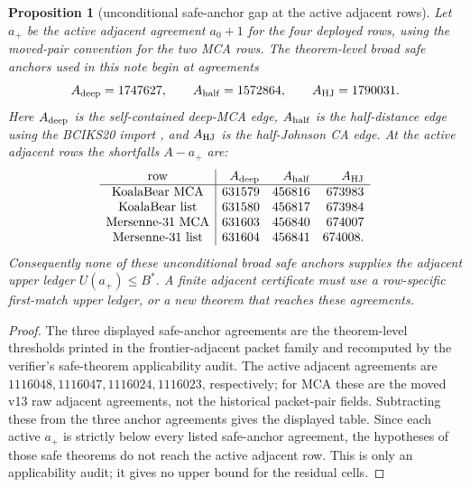 \documentclass[a4paper,11pt]{amsart}
\newtheorem{proposition}[proposition]{Proposition}
\theoremstyle{remark}
\begin{document}
\begin{proposition}[unconditional safe-anchor gap at the active adjacent rows]\label{prop:finite-safe-anchor-gap}
Let \(a_+\) be the active adjacent agreement \(a_0+1\) for the four deployed rows, using the moved-pair convention for the two MCA rows.  The theorem-level broad safe anchors used in this note begin at agreements
\[
        A_{\rm deep}=1747627,\qquad
        A_{\rm half}=1572864,\qquad
        A_{\rm HJ}=1790031.
\]
Here \(A_{\rm deep}\) is the self-contained deep-MCA edge, \(A_{\rm half}\) is the half-distance edge using the BCIKS20 import \cite{BCIKS20}, and \(A_{\rm HJ}\) is the half-Johnson CA edge.  At the active adjacent rows the shortfalls \(A-a_+\) are:
\[
\begin{array}{c|rrr}
\text{row} & A_{\rm deep} & A_{\rm half} & A_{\rm HJ}\\ \hline
\text{KoalaBear MCA} & 631579 & 456816 & 673983\\
\text{KoalaBear list} & 631580 & 456817 & 673984\\
\text{Mersenne-31 MCA} & 631603 & 456840 & 674007\\
\text{Mersenne-31 list} & 631604 & 456841 & 674008 .
\end{array}
\]
Consequently none of these unconditional broad safe anchors supplies the adjacent upper ledger \(U(a_+)\le B^*\).  A finite adjacent certificate must use a row-specific first-match upper ledger, or a new theorem that reaches these agreements.
\end{proposition}

\begin{proof}
The three displayed safe-anchor agreements are the theorem-level thresholds printed in the frontier-adjacent packet family and recomputed by the verifier's safe-theorem applicability audit.  The active adjacent agreements are \(1116048,1116047,1116024,1116023\), respectively; for MCA these are the moved v13 raw adjacent agreements, not the historical packet-pair fields.  Subtracting these from the three anchor agreements gives the displayed table.  Since each active \(a_+\) is strictly below every listed safe-anchor agreement, the hypotheses of those safe theorems do not reach the active adjacent row.  This is only an applicability audit; it gives no upper bound for the residual cells.
\end{proof}
\end{document}
